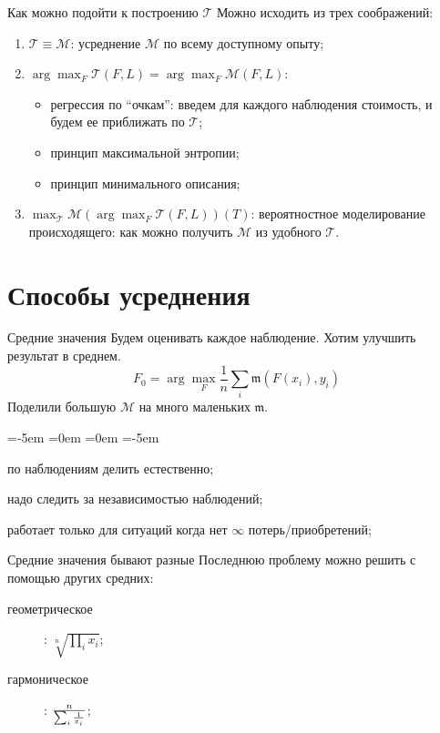 \documentclass[14pt, fleqn, xcolor={dvipsnames, table}]{beamer}
\begin{document}
\begin{frame}{Как можно подойти к построению $\mathcal{T}$}
Можно исходить из трех соображений:
\begin{enumerate}
  \item {\color{blue}$\mathcal{T} \equiv \mathcal{M}$:} усреднение $\mathcal{M}$ по всему доступному опыту;
  \item {\color{blue}$\arg\max_{F} \mathcal{T}(F, L) = \arg\max_{F} \mathcal{M}(F, L)$:}~\\
  \begin{itemize}
    \item регрессия по ``очкам'': введем для каждого наблюдения стоимость, и будем ее приближать по $\mathcal{T}$;
    \item принцип максимальной энтропии;
    \item принцип минимального описания;
  \end{itemize}
  \item {\color{blue}$\max_{\mathcal{T}} \mathcal{M} \left(\arg\max_{F} \mathcal{T}(F, L)\right)(T)$:} вероятностное моделирование происходящего: как можно получить $\mathcal{M}$ из удобного $\mathcal{T}$.
\end{enumerate} 
\end{frame}

\section{Способы усреднения}

\begin{frame}{Средние значения}
Будем оценивать каждое наблюдение. Хотим улучшить результат в среднем.
$$
F_0 = \arg \max_F \frac{1}{n} \sum_i \mathfrak{m}(F(x_i),y_i)
$$
Поделили большую $\mathcal{M}$ на много маленьких $\mathfrak{m}$. 
\begin{description}
\small
\leftmargin=-5em
\itemindent=0em
=0em
\leftskip=-5em
  \item[\color{green}+] по наблюдениям делить естественно;
  \item[\color{red}---] надо следить за независимостью наблюдений;
  \item[\color{red}---] работает только для ситуаций когда нет $\infty$ потерь/приобретений;
\end{description} 
\end{frame}

\begin{frame}{Средние значения бывают разные}
Последнюю проблему можно решить с помощью других средних:

\begin{description}
  \item[геометрическое]: $\sqrt[n]{\prod_i x_i}$; 
  \item[гармоническое]: $n\over \sum_i \frac{1}{x_i}$;
\end{description}
\end{frame}
\end{document}

